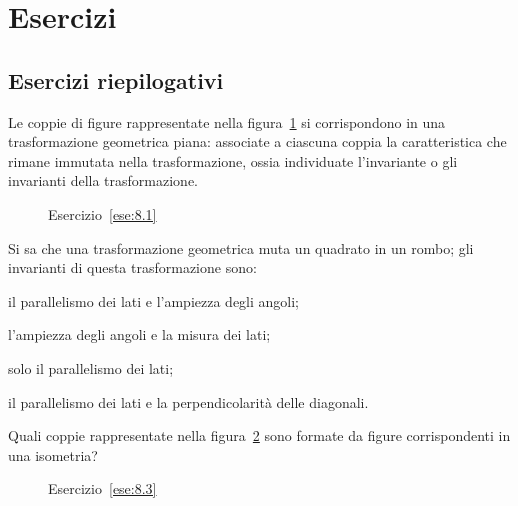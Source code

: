 
\section{Esercizi}

\subsection{Esercizi riepilogativi}

\begin{esercizio}
\label{ese:8.1}
Le coppie di figure rappresentate nella figura~\ref{fig:ese8.1} si 
corrispondono in una trasformazione geometrica piana: associate a 
ciascuna coppia la caratteristica che rimane immutata nella 
trasformazione, ossia individuate l'invariante o gli invarianti della 
trasformazione.
\end{esercizio}


\begin{inaccessibleblock}
 \begin{figure}[!htb]
	\centering
	\caption{Esercizio~\ref{ese:8.1}}\label{fig:ese8.1}
\end{figure}
\end{inaccessibleblock}

\begin{esercizio}
\label{ese:8.2}
Si sa che una trasformazione geometrica muta un quadrato in un rombo; 
gli invarianti di questa trasformazione sono:
\begin{enumeratea}
\item il parallelismo dei lati e l'ampiezza degli angoli;
\item l'ampiezza degli angoli e la misura dei lati;
\item solo il parallelismo dei lati;
\item il parallelismo dei lati e la perpendicolarità delle diagonali.
\end{enumeratea}
\end{esercizio}

\begin{esercizio}
\label{ese:8.3}
Quali coppie rappresentate nella figura~\ref{fig:ese8.3} sono formate 
da figure corrispondenti in una isometria?
\end{esercizio}


\begin{inaccessibleblock}
 \begin{figure}[!htb]
	\centering
	\caption{Esercizio~\ref{ese:8.3}}\label{fig:ese8.3}
\end{figure}
\end{inaccessibleblock}


